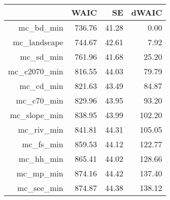 \begin{table}[ht]
\centering
\begin{tabular}{rrrr}
  \hline
 & WAIC & SE & dWAIC \\ 
  \hline
mc\_bd\_min & 736.76 & 41.28 & 0.00 \\ 
  mc\_landscape & 744.67 & 42.61 & 7.92 \\ 
  mc\_sd\_min & 761.96 & 41.68 & 25.20 \\ 
  mc\_c2070\_min & 816.55 & 44.03 & 79.79 \\ 
  mc\_cd\_min & 821.63 & 43.49 & 84.87 \\ 
  mc\_c70\_min & 829.96 & 43.95 & 93.20 \\ 
  mc\_slope\_min & 838.95 & 43.99 & 102.20 \\ 
  mc\_riv\_min & 841.81 & 44.31 & 105.05 \\ 
  mc\_fs\_min & 859.53 & 44.12 & 122.77 \\ 
  mc\_hh\_min & 865.41 & 44.02 & 128.66 \\ 
  mc\_mp\_min & 874.16 & 44.42 & 137.40 \\ 
  mc\_see\_min & 874.87 & 44.38 & 138.12 \\ 
   \hline
\end{tabular}
\end{table}
